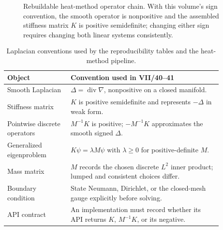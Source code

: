\begin{figure}[htbp]
\centering
{}
\caption{Rebuildable heat-method operator chain. With this volume's sign convention, the smooth operator is nonpositive and the assembled stiffness matrix $K$ is positive semidefinite; changing either sign requires changing both linear systems consistently.}
\label{fig:vii40-c16-repro-pipeline}
\end{figure}

\begin{table}[htbp]
\centering\small
\begin{tabular}{p{0.26\linewidth}p{0.62\linewidth}}
\toprule
Object & Convention used in VII/40--41\\
\midrule
Smooth Laplacian & $\Delta=\operatorname{div}\nabla$, nonpositive on a closed manifold.\\
Stiffness matrix & $K$ is positive semidefinite and represents $-\Delta$ in weak form.\\
Pointwise discrete operators & $M^{-1}K$ is positive; $-M^{-1}K$ approximates the smooth signed $\Delta$.\\
Generalized eigenproblem & $K\psi=\lambda M\psi$ with $\lambda\ge0$ for positive-definite $M$.\\
Mass matrix & $M$ records the chosen discrete $L^2$ inner product; lumped and consistent choices differ.\\
Boundary condition & State Neumann, Dirichlet, or the closed-mesh gauge explicitly before solving.\\
API contract & An implementation must record whether its API returns $K$, $M^{-1}K$, or its negative.\\
\bottomrule
\end{tabular}
\caption{Laplacian conventions used by the reproducibility tables and the heat-method pipeline.}
\label{tab:vii40-c16-laplacian-conventions}
\end{table}
